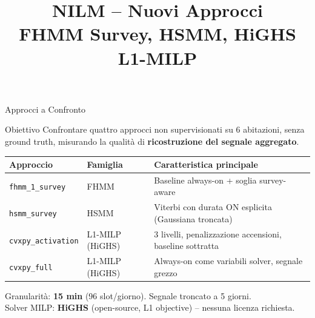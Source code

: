 \documentclass[aspectratio=169]{beamer}
\title{NILM -- Nuovi Approcci\\FHMM Survey, HSMM, HiGHS L1-MILP}
\author{}
\date{}
\newcommand{\code}[1]{\texttt{\small #1}}
\begin{document}
\begin{frame}
  \titlepage
\end{frame}

\begin{frame}{Approcci a Confronto}
  \begin{block}{Obiettivo}
    Confrontare quattro approcci non supervisionati su 6 abitazioni,
    senza ground truth, misurando la qualit\`a di \textbf{ricostruzione del segnale aggregato}.
  \end{block}

  \vspace{0.6em}
  \begin{table}
    \small
    \renewcommand{\arraystretch}{1.2}
    \begin{tabularx}{\textwidth}{l l X}
      \toprule
      \textbf{Approccio} & \textbf{Famiglia} & \textbf{Caratteristica principale} \\
      \midrule
      \code{fhmm\_1\_survey} & FHMM & Baseline always-on + soglia survey-aware \\
      \code{hsmm\_survey}    & HSMM & Viterbi con durata ON esplicita (Gaussiana troncata) \\
      \code{cvxpy\_activation} & L1-MILP (HiGHS) & 3 livelli, penalizzazione accensioni, baseline sottratta \\
      \code{cvxpy\_full}       & L1-MILP (HiGHS) & Always-on come variabili solver, segnale grezzo \\
      \bottomrule
    \end{tabularx}
  \end{table}

  \vspace{0.4em}
  \small
  Granularit\`a: \textbf{15 min} (96 slot/giorno). Segnale troncato a 5 giorni.\\
  Solver MILP: \textbf{HiGHS} (open-source, L1 objective) -- nessuna licenza richiesta.
\end{frame}
\end{document}
